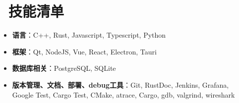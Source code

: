 \documentclass{resume}
\begin{document}

\section{\faCogs\ 技能清单}
\begin{itemize}[parsep=0.5ex]
    \item \textbf{语言}：C++, Rust, Javascript, Typescript, Python
    \item \textbf{框架}：Qt, NodeJS, Vue, React, Electron, Tauri
    \item \textbf{数据库相关}：PostgreSQL, SQLite
    \item \textbf{版本管理、文档、部署、debug工具}：Git, RustDoc, Jenkins, Grafana, Google Test, Cargo Test, CMake, atrace, Cargo, gdb, valgrind, wireshark
\end{itemize}



%
%
\end{document}
